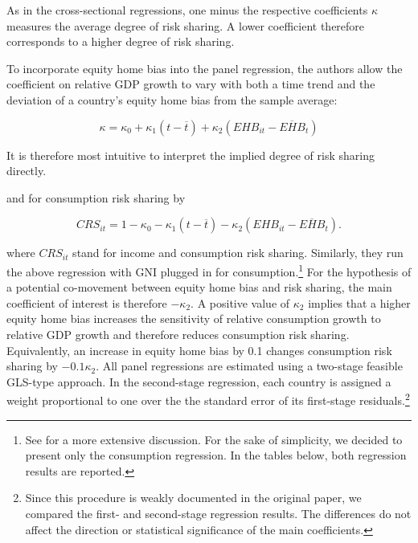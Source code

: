 \documentclass[12pt,a4paper]{article}
\begin{document}
As in the cross-sectional regressions, one minus the respective coefficients
\(\kappa\) measures the average degree of risk sharing. A lower
coefficient therefore corresponds to a higher degree of risk sharing.

To incorporate equity home bias into the panel regression, the authors allow the
coefficient on relative GDP growth to vary with both a time trend and the deviation of
a country's equity home bias from the sample average:

\begin{equation}
\kappa
=
\kappa_0
+
\kappa_1(t - \overline{t})
+
\kappa_2(EHB_{it} - \overline{EHB}_t)
\end{equation}


It is therefore most intuitive to interpret the implied degree of risk sharing
directly. 

and for consumption risk sharing by

\begin{equation}
CRS_{it}
=
1 - \kappa_0
-
\kappa_1(t - \overline{t})
-
\kappa_2(EHB_{it} - \overline{EHB}_t).
\end{equation}

where \(CRS_{it}\) stand for income and consumption risk sharing. Similarly, they run the above regression 
with GNI plugged in for consumption.\footnote{See \textcite{main} for a more extensive discussion. For the sake of simplicity, we decided to present only the consumption regression.
In the tables below, both regression results are reported.}
For the hypothesis of a potential co-movement between equity home bias and risk
sharing, the main coefficient of interest is therefore \(-\kappa_2\). A positive value of \(\kappa_2\) implies that a higher equity home bias
increases the sensitivity of relative consumption growth to relative GDP growth and therefore
reduces consumption risk sharing. Equivalently, an increase in equity home bias by 0.1
changes consumption risk sharing by \(-0.1\kappa_2\).
All panel regressions are estimated using a two-stage feasible GLS-type approach.
In the second-stage regression, each country is assigned a weight proportional to one over the
 the standard error of its first-stage residuals.\footnote{Since this
procedure is weakly documented in the original paper, we compared the first- and
second-stage regression results. The differences do not affect the direction or
statistical significance of the main coefficients.}
\end{document}
